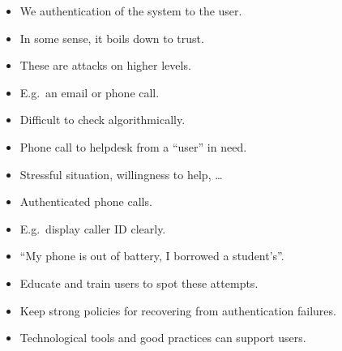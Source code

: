 \begin{frame}
  \begin{remark}
    \begin{itemize}
      \item We authentication of the system to the user.
      \item In some sense, it boils down to trust.
    \end{itemize}
  \end{remark}
\end{frame}

\begin{frame}
  \begin{remark}
    \begin{itemize}
      \item These are attacks on higher levels.
      \item E.g.\ an email or phone call.
      \item Difficult to check algorithmically.
    \end{itemize}
  \end{remark}

  \begin{example}
    \begin{itemize}
      \item Phone call to helpdesk from a \enquote{user} in need.
      \item Stressful situation, willingness to help, \dots
    \end{itemize}
  \end{example}
\end{frame}

\begin{frame}
  \begin{example}[Solution?]
    \begin{itemize}
      \item Authenticated phone calls.
      \item E.g.\ display caller ID clearly.
      \item \enquote{My phone is out of battery, I borrowed a student's}.
    \end{itemize}
  \end{example}

  \begin{solution}
    \begin{itemize}
      \item Educate and train users to spot these attempts.

      \item Keep strong policies for recovering from authentication failures. 

      \item Technological tools and good practices can support users.
    \end{itemize}
  \end{solution}
\end{frame}


